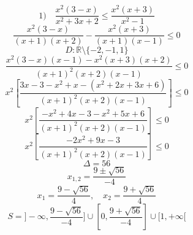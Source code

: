 \documentclass{article}
\begin{document}
\[ 1) \quad \frac{x^2(3-x)}{x^2+3x+2} \le \frac{x^2(x+3)}{x^2-1} \]
\[ \frac{x^2(3-x)}{(x+1)(x+2)} - \frac{x^2(x+3)}{(x+1)(x-1)} \le 0 \]
\[ D: \mathbb{R} \setminus \{-2, -1, 1\} \]
\[ \frac{x^2(3-x)(x-1) - x^2(x+3)(x+2)}{(x+1)^2(x+2)(x-1)} \le 0 \]
\[ x^2 \left[ \frac{3x-3-x^2+x - (x^2+2x+3x+6)}{(x+1)^2(x+2)(x-1)} \right] \le 0 \]
\[ x^2 \left[ \frac{-x^2+4x-3 - x^2+5x+6}{(x+1)^2(x+2)(x-1)} \right] \le 0 \]
\[x^2 \left[ \frac{-2x^2+9x-3}{(x+1)^2(x+2)(x-1)} \right] \le 0 \]
\[ \Delta = 56 \]
\[ x_{1,2} = \frac{9 \pm \sqrt{56}}{-4} \]
\[ x_1 = \frac{9-\sqrt{56}}{4}, \quad x_2 = \frac{9+\sqrt{56}}{4} \]
\[ S = ]-\infty, \frac{9-\sqrt{56}}{-4}] \cup [0, \frac{9+\sqrt{56}}{-4}] \cup [1, +\infty[ \]
\end{document}
